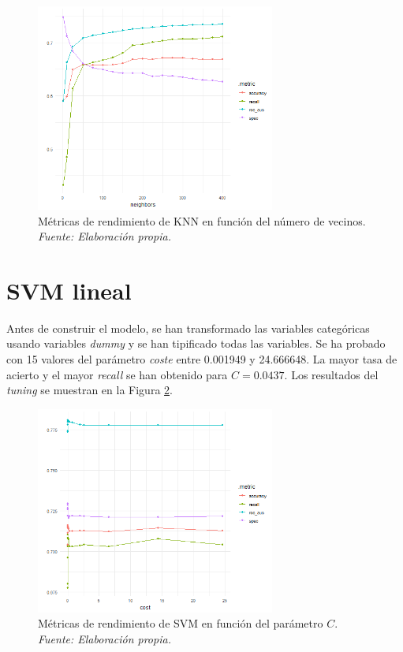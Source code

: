 \documentclass[12pt,a4paper,]{book}
\newcounter{dummy}
\numberwithin{dummy}{section}
\theoremstyle{ocrenumbox}
\theoremstyle{blacknumex}
\theoremstyle{blacknumbox}
\theoremstyle{ocrenum}
\theoremstyle{ocrenum}
\begin{document}
\begin{figure}[h!]
\centering
\includegraphics[width =0.7\textwidth]{graficos/knn_tuningplot.png}
\caption[Métricas de rendimiento de KNN en función de $k$]{Métricas de rendimiento de KNN en función del número de vecinos. \it Fuente: Elaboración propia.}
\label{fig:knn_tuningplot}
\end{figure}

\hypertarget{svm-lineal}{%
\section{SVM lineal}\label{svm-lineal}}

Antes de construir el modelo, se han transformado las variables
categóricas usando variables \emph{dummy} y se han tipificado todas las
variables. Se ha probado con 15 valores del parámetro \emph{coste} entre
0.001949 y 24.666648. La mayor tasa de acierto y el mayor \emph{recall}
se han obtenido para \(C = 0.0437\). Los resultados del \emph{tuning} se
muestran en la Figura \ref{fig:svm_tuningplot}.

\begin{figure}[h!]
\centering
\includegraphics[width =0.7\textwidth]{graficos/svm_tuningplot.png}
\caption[Métricas de rendimiento de SVM en función del parámetro $coste$]{Métricas de rendimiento de SVM en función del parámetro $C$. \it Fuente: Elaboración propia.}
\label{fig:svm_tuningplot}
\end{figure}
\end{document}
